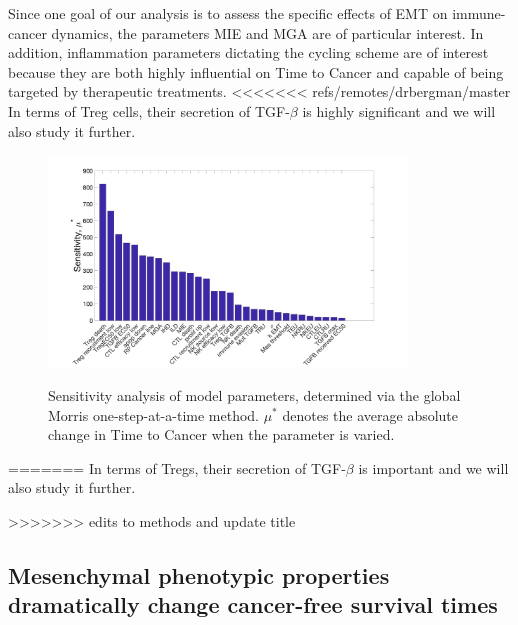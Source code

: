 \documentclass[11pt]{article}
\begin{document}
Since one goal of our analysis is to assess the specific effects of EMT on immune-cancer dynamics, the parameters MIE and MGA are of particular interest.
In addition, inflammation parameters dictating the cycling scheme are of interest because they are both highly influential on Time to Cancer and capable of being targeted by therapeutic treatments.
<<<<<<< refs/remotes/drbergman/master
In terms of Treg cells, their secretion of TGF-$\beta$ is highly significant and we will also study it further.


\begin{figure}
\center
{\includegraphics[width=0.85\textwidth]{Figure2/Figure2.jpg}}
\caption{Sensitivity analysis of model parameters, determined via the global Morris one-step-at-a-time method. $\mu^*$ denotes the average absolute change in Time to Cancer when the parameter is varied.}
\label{fig:MOAT}
\end{figure}
=======
In terms of Tregs, their secretion of TGF-$\beta$ is important and we will also study it further.


>>>>>>> edits to methods and update title

\subsection{Mesenchymal phenotypic properties dramatically change cancer-free survival times}\label{MesPars}
\end{document}
